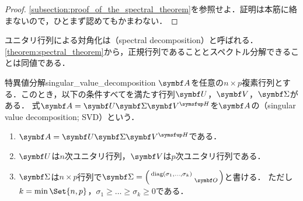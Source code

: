 \documentclass[../../main]{subfiles}
\begin{document}
\begin{proof}
  \cref{subsection:proof_of_the_spectral_theorem}を参照せよ．証明は本筋に絡まないので，ひとまず認めてもかまわない．
\end{proof}

ユニタリ行列による対角化は（spectral decomposition）と呼ばれる．
\cref{theorem:spectral_theorem}から，正規行列であることとスペクトル分解できることは同値である．

\begin{corollary}{特異値分解}{singular_value_decomposition}
  \(\mat{A}\)を任意の\(n\times p\)複素行列とする．このとき，以下の条件すべてを満たす行列\(\mat{U}\)，\(\mat{V}\)，\(\mat{\Sigma}\)がある．
  式\(\mat{A}=\mat{U}\mat{\Sigma}\htrps{\mat{V}}\)を\(\mat{A}\)の（singular value decomposition; SVD）という．
  \begin{enumerate}
    \item \(\mat{A}=\mat{U}\mat{\Sigma}\htrps{\mat{V}}\)である．
    \item \(\mat{U}\)は\(n\)次ユニタリ行列，\(\mat{V}\)は\(p\)次ユニタリ行列である．
    \item \(\mat{\Sigma}\)は\(n\times p\)行列で\(\mat{\Sigma}=\smallmatrice{\diag(\sigma_1,\dots,\sigma_k) & \\ & \zmat}\)と書ける．
      ただし\(k=\min\Set{n,p}\)，\(\sigma_1\geq\dots\geq\sigma_k\geq 0\)である．
  \end{enumerate}
\end{corollary}
\end{document}
